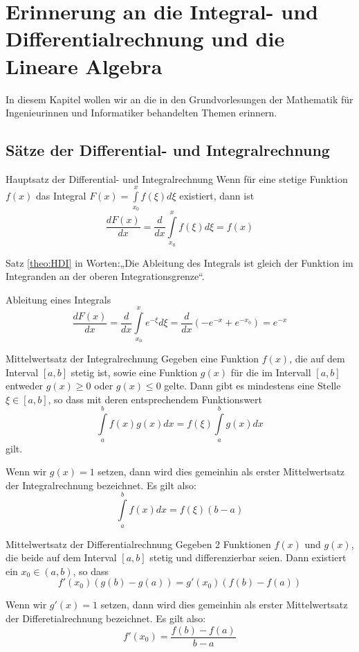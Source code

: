\chapter[Erinnerung an die \dots]{Erinnerung an die Integral- und
Differentialrechnung und die Lineare Algebra}
In diesem Kapitel wollen wir an die in den Grundvorlesungen der Mathematik für
Ingenieurinnen und Informatiker behandelten Themen erinnern.
\section{Sätze der Differential- und Integralrechnung}
\begin{satz}{Hauptsatz der Differential- und Integralrechnung\label{theo:HSIntegralDiff}}
Wenn für eine stetige Funktion $f(x)$ das Integral
$F(x)=\int\limits_{x_0}^{x}f(\xi)d\xi$ existiert, dann ist
\[
  \frac{dF(x)}{dx}=\frac{d}{dx}\int\limits_{x_0}^{x}f(\xi)d\xi=f(x)
\]
\label{theo:HDI}
\end{satz}
Satz \ref{theo:HDI} in Worten:„Die Ableitung des Integrals ist gleich der
Funktion im Integranden an der oberen Integrationsgrenze“.
\begin{example}{Ableitung eines Integrals}
\[
 \frac{d F(x)}{dx}=\frac{d}{dx}\int\limits_{x_0}^{x}e^{-\xi}d\xi=
 \frac{d}{dx} \left(-e^{-x}+e^{-x_0}\right)=e^{-x}
\]
\end{example}
\begin{satz}{Mittelwertsatz der Integralrechnung}
  Gegeben eine Funktion $f(x)$, die auf dem Interval $[a,b]$ stetig ist, sowie
  eine Funktion $g(x)$ für die im Intervall $[a,b]$ entweder $g(x)\ge0$ oder
  $g(x)\le0$ gelte. Dann gibt es mindestens eine Stelle $\xi\in[a,b]$, so dass
  mit deren entsprechendem Funktionswert 
  \begin{equation} 
  \int\limits_a^bf(x)g(x)dx=f(\xi)\int\limits_a^bg(x)dx 
  \label{eq:MittelwertInt2} 
  \end{equation}
  gilt.   
\end{satz}
Wenn wir $g(x)=1 $ setzen, dann wird dies gemeinhin als erster
Mittelwertsatz der Integralrechnung bezeichnet. Es gilt also:
\begin{equation} 
  \int\limits_a^bf(x)dx=f(\xi)(b-a)
  \label{eq:MittelwertInt1}
\end{equation}
\begin{satz}{Mittelwertsatz der Differentialrechnung}
  Gegeben 2 Funktionen $f(x)$ und $g(x)$, die beide auf dem Interval $[a,b]$
  stetig und differenzierbar seien. Dann existiert ein $x_0\in(a,b)$, so dass   
  \begin{equation}
    f'(x_0)\left(g(b)-g(a)\right)= g'(x_0)\left(f(b)-f(a)\right)
  \label{eq:MittelwertDiff2}
\end{equation}
\end{satz}
Wenn wir $g'(x)=1 $ setzen, dann wird dies gemeinhin als erster
Mittelwertsatz der Differetialrechnung bezeichnet. Es gilt also:
\begin{equation}
  f'(x_0)=\frac{f(b)-f(a)}{b-a}
  \label{eq:MittelwertDiff1}
\end{equation}
